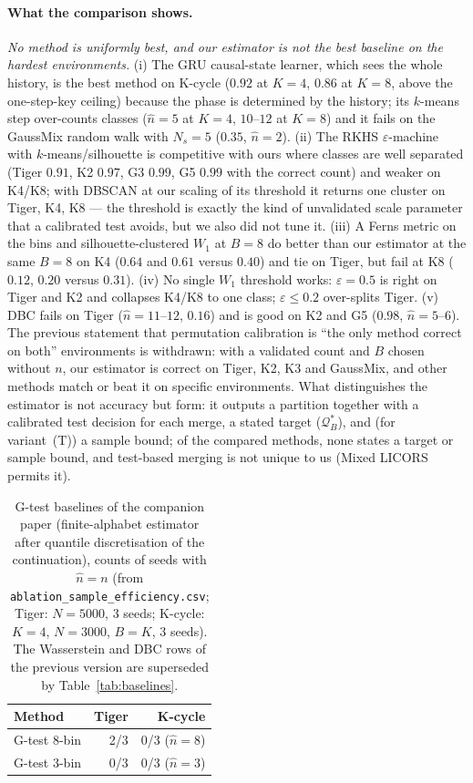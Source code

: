 \documentclass[10pt]{article}
\newcommand{\Qstar}{\mathcal{Q}^*}
\begin{document}
\paragraph{What the comparison shows.}
\emph{No method is uniformly best, and our estimator is not the best baseline
on the hardest environments.}  (i) The GRU causal-state learner, which sees the
whole history, is the best method on K-cycle ($0.92$ at $K=4$, $0.86$ at $K=8$,
above the one-step-key ceiling) because the phase is determined by the history;
its $k$-means step over-counts classes ($\hat n=5$ at $K=4$, $10$--$12$ at
$K=8$) and it fails on the GaussMix random walk with $N_s=5$ ($0.35$, $\hat n=2$).
(ii) The RKHS $\varepsilon$-machine with $k$-means/silhouette is competitive with
ours where classes are well separated (Tiger $0.91$, K2 $0.97$, G3 $0.99$, G5
$0.99$ with the correct count) and weaker on K4/K8; with DBSCAN at our scaling
of its threshold it returns one cluster on Tiger, K4, K8 --- the threshold is
exactly the kind of unvalidated scale parameter that a calibrated test avoids,
but we also did not tune it.  (iii) A Ferns metric on the bins and
silhouette-clustered $W_1$ at $B=8$ do better than our estimator at the same
$B=8$ on K4 ($0.64$ and $0.61$ versus $0.40$) and tie on Tiger, but fail at K8
($0.12$, $0.20$ versus $0.31$).  (iv) No single $W_1$ threshold works: $\varepsilon=0.5$ is right
on Tiger and K2 and collapses K4/K8 to one class; $\varepsilon\le0.2$ over-splits
Tiger.  (v) DBC fails on Tiger ($\hat n=11$--$12$, $0.16$) and is good on K2 and
G5 ($0.98$, $\hat n=5$--$6$).
The previous statement that permutation calibration is ``the only method correct
on both'' environments is withdrawn: with a validated count and $B$ chosen
without $n$, our estimator is correct on Tiger, K2, K3 and GaussMix, and other
methods match or beat it on specific environments.  What distinguishes the
estimator is not accuracy but form: it outputs a partition together with a
calibrated test decision for each merge, a stated target ($\Qstar_B$), and (for
variant~(T)) a sample bound; of the compared methods, none states a target or sample
bound, and test-based merging is not unique to us (Mixed LICORS permits it).

\begin{table}[t]
\centering
\caption{G-test baselines of the companion paper (finite-alphabet estimator
  after quantile discretisation of the continuation), counts of seeds with
  $\hat n=n$ (from \texttt{ablation\_sample\_efficiency.csv}; Tiger: $N=5000$, 3
  seeds; K-cycle: $K=4$, $N=3000$, $B=K$, 3 seeds).  The Wasserstein and DBC rows
  of the previous version are superseded by Table~\ref{tab:baselines}.}
\label{tab:ablation}
\begin{tabular}{lrr}
\toprule
Method & Tiger & K-cycle \\
\midrule
G-test 8-bin                               & 2/3   & 0/3 ($\hat n=8$) \\
G-test 3-bin                               & 0/3   & 0/3 ($\hat n=3$) \\
\bottomrule
\end{tabular}
\end{table}
\end{document}
